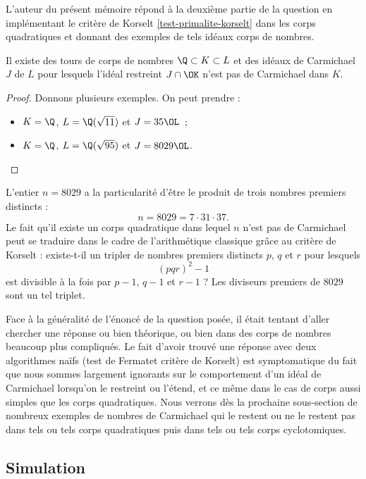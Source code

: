 L'auteur du présent mémoire répond à la deuxième partie de la question en implémentant le critère de Korselt \ref{test-primalite-korselt} dans les corps quadratiques et donnant des exemples de tels idéaux corps de nombres.

\begin{proposition}\label{deuxieme-ce}
	Il existe des tours de corps de nombres $\Q\subset K \subset L$ et des idéaux de Carmichael $J$ de $L$ pour lesquels l'idéal restreint $J\cap \OK$ n'est pas de Carmichael dans $K$.
\end{proposition}

\begin{proof}
Donnons plusieurs exemples. On peut prendre :
\begin{itemize}
	\item $K = \Q$, $L = \Q(\sqrt{11})$ et $J = 35\OL$~;
	\item $K = \Q$, $L = \Q(\sqrt{95})$ et $J = 8029\OL$.
\end{itemize}
\end{proof}


\begin{remarque}
L'entier $n = 8029$ a la particularité d'être le produit de trois nombres premiers distincts : \[n = 8029 = 7 \cdot 31 \cdot 37.\] Le fait qu'il existe un corps quadratique dans lequel $n$ n'est pas de Carmichael peut se traduire dans le cadre de l'arithmétique classique grâce au critère de Korselt : existe-t-il un tripler de nombres premiers distincts $p$, $q$ et $r$ pour lesquels \[(pqr)^2 - 1\] est divisible à la fois par $p-1$, $q-1$ et $r-1$ ? Les diviseurs premiers de $8029$ sont un tel triplet.
\end{remarque}

Face à la généralité de l'énoncé de la question posée, il était tentant d'aller chercher une réponse ou bien théorique, ou bien dans des corps de nombres beaucoup plus compliqués. Le fait d'avoir trouvé une réponse avec deux algorithmes naïfs (test de Fermatet critère de Korselt) est symptomatique du fait que nous sommes largement ignorants sur le comportement d'un idéal de Carmichael lorsqu'on le restreint ou l'étend, et ce même dans le cas de corps aussi simples que les corps quadratiques. Nous verrons dès la prochaine sous-section de nombreux exemples de nombres de Carmichael qui le restent ou ne le restent pas dans tels ou tels corps quadratiques puis dans tels ou tels corps cyclotomiques.

\subsection{Simulation}

